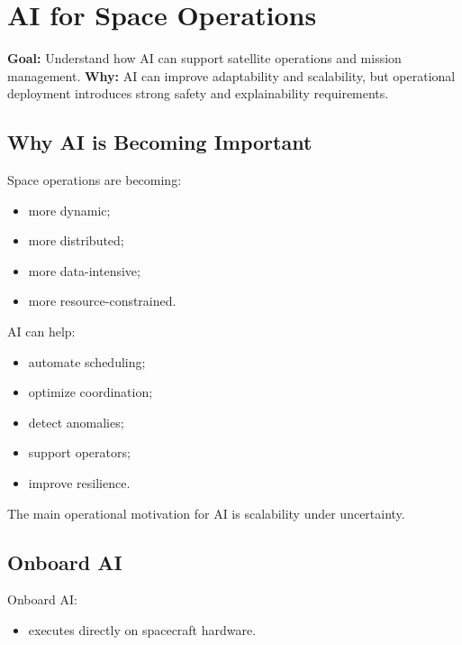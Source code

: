\documentclass[10pt,a4paper,twocolumn]{article}
\newcommand{\lesson}[3]{
\section{#1}
\noindent
\textbf{Goal:} #2 \newline
\textbf{Why:} #3
\vspace{0.1em}
}
\begin{document}


\lesson
{AI for Space Operations}
{Understand how AI can support satellite operations and mission management.}
{AI can improve adaptability and scalability, but operational deployment introduces strong safety and explainability requirements.}


\subsection{Why AI is Becoming Important}

Space operations are becoming:
\begin{itemize}
    \item more dynamic;
    \item more distributed;
    \item more data-intensive;
    \item more resource-constrained.
\end{itemize}

AI can help:
\begin{itemize}
    \item automate scheduling;
    \item optimize coordination;
    \item detect anomalies;
    \item support operators;
    \item improve resilience.
\end{itemize}

\begin{keybox}
    The main operational motivation for AI is scalability under uncertainty.
\end{keybox}


\subsection{Onboard AI}

Onboard AI:
\begin{itemize}
    \item executes directly on spacecraft hardware.
\end{itemize}
\end{document}
